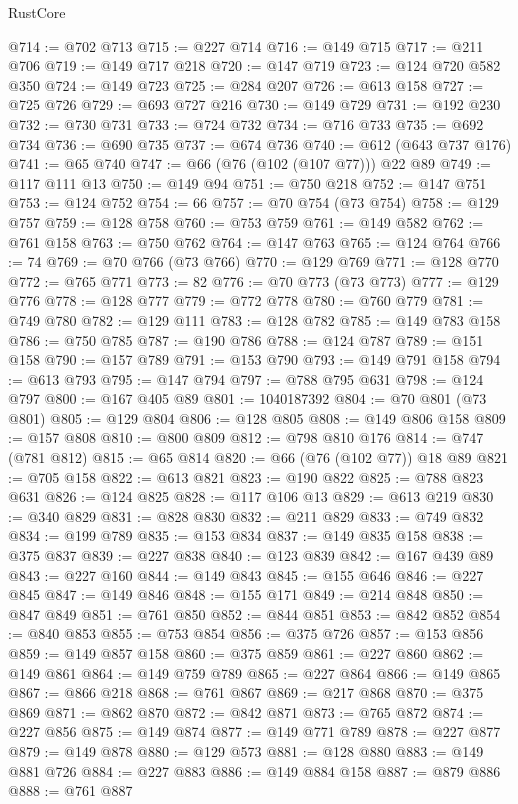 \begin{lexlean}{RustCore}
\begin{coremodule}
@714 := @702 @713
@715 := @227 @714
@716 := @149 @715
@717 := @211 @706
@719 := @149 @717 @218
@720 := @147 @719
@723 := @124 @720 @582 @350
@724 := @149 @723
@725 := @284 @207
@726 := @613 @158
@727 := @725 @726
@729 := @693 @727 @216
@730 := @149 @729
@731 := @192 @230
@732 := @730 @731
@733 := @724 @732
@734 := @716 @733
@735 := @692 @734
@736 := @690 @735
@737 := @674 @736
@740 := @612 (@643 @737 @176)
@741 := @65 @740
@747 := @66 (@76 (@102 (@107 @77))) @22 @89
@749 := @117 @111 @13
@750 := @149 @94
@751 := @750 @218
@752 := @147 @751
@753 := @124 @752
@754 := 66
@757 := @70 @754 (@73 @754)
@758 := @129 @757
@759 := @128 @758
@760 := @753 @759
@761 := @149 @582
@762 := @761 @158
@763 := @750 @762
@764 := @147 @763
@765 := @124 @764
@766 := 74
@769 := @70 @766 (@73 @766)
@770 := @129 @769
@771 := @128 @770
@772 := @765 @771
@773 := 82
@776 := @70 @773 (@73 @773)
@777 := @129 @776
@778 := @128 @777
@779 := @772 @778
@780 := @760 @779
@781 := @749 @780
@782 := @129 @111
@783 := @128 @782
@785 := @149 @783 @158
@786 := @750 @785
@787 := @190 @786
@788 := @124 @787
@789 := @151 @158
@790 := @157 @789
@791 := @153 @790
@793 := @149 @791 @158
@794 := @613 @793
@795 := @147 @794
@797 := @788 @795 @631
@798 := @124 @797
@800 := @167 @405 @89
@801 := 1040187392
@804 := @70 @801 (@73 @801)
@805 := @129 @804
@806 := @128 @805
@808 := @149 @806 @158
@809 := @157 @808
@810 := @800 @809
@812 := @798 @810 @176
@814 := @747 (@781 @812)
@815 := @65 @814
@820 := @66 (@76 (@102 @77)) @18 @89
@821 := @705 @158
@822 := @613 @821
@823 := @190 @822
@825 := @788 @823 @631
@826 := @124 @825
@828 := @117 @106 @13
@829 := @613 @219
@830 := @340 @829
@831 := @828 @830
@832 := @211 @829
@833 := @749 @832
@834 := @199 @789
@835 := @153 @834
@837 := @149 @835 @158
@838 := @375 @837
@839 := @227 @838
@840 := @123 @839
@842 := @167 @439 @89
@843 := @227 @160
@844 := @149 @843
@845 := @155 @646
@846 := @227 @845
@847 := @149 @846
@848 := @155 @171
@849 := @214 @848
@850 := @847 @849
@851 := @761 @850
@852 := @844 @851
@853 := @842 @852
@854 := @840 @853
@855 := @753 @854
@856 := @375 @726
@857 := @153 @856
@859 := @149 @857 @158
@860 := @375 @859
@861 := @227 @860
@862 := @149 @861
@864 := @149 @759 @789
@865 := @227 @864
@866 := @149 @865
@867 := @866 @218
@868 := @761 @867
@869 := @217 @868
@870 := @375 @869
@871 := @862 @870
@872 := @842 @871
@873 := @765 @872
@874 := @227 @856
@875 := @149 @874
@877 := @149 @771 @789
@878 := @227 @877
@879 := @149 @878
@880 := @129 @573
@881 := @128 @880
@883 := @149 @881 @726
@884 := @227 @883
@886 := @149 @884 @158
@887 := @879 @886
@888 := @761 @887

\end{coremodule}
\end{lexlean}
